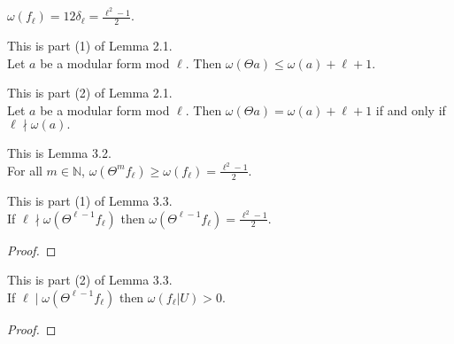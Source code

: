\begin{lemma}
  \label{lem:Filt_fl}
  \leanok
  $ \omega (f_\ell) = 12 \delta_\ell = \frac{\ell^2 - 1}{2}.$
\end{lemma}

\begin{theorem}
  \label{thm:Filt_Theta_bound}
  \leanok
  This is part (1) of Lemma 2.1. \\
  Let $a$ be a modular form mod $\ell$. Then $\omega (\Theta a) \le \omega (a) + \ell + 1$.
\end{theorem}

\begin{theorem}
  \label{thm:Filt_Theta_iff}
  \leanok
  This is part (2) of Lemma 2.1. \\
  Let $a$ be a modular form mod $\ell$. Then $\omega (\Theta a) = \omega (a) + \ell + 1$ 
  if and only if $\ell \nmid \omega (a).$
\end{theorem}

\begin{theorem}
  \label{thm:le_Filt_Theta_fl}
  \leanok
  This is Lemma 3.2. \\
  For all $m \in \mathbb{N}$, $\omega (\Theta^m f_\ell) \ge \omega (f_\ell) = \frac{\ell^2 - 1}{2}.$
\end{theorem} 


\begin{theorem}
  \label{thm:Filt_Theta_pow_l_sub_one} 
  \leanok
  This is part (1) of Lemma 3.3. \\
  If $\ell \nmid \omega (\Theta^{\ell - 1} f_\ell)$ then 
  $\omega (\Theta^{\ell - 1} f_\ell) = \frac{\ell^2 - 1}{2}.$
\end{theorem}
\begin{proof}
  \leanok
\end{proof}


\begin{theorem}
  \label{thm:Filt_U_pos}
  \leanok
  This is part (2) of Lemma 3.3. \\
  If $\ell \mid \omega (\Theta^{\ell - 1} f_\ell)$ then 
  $\omega (f_\ell | U) > 0$.
\end{theorem}
\begin{proof}
  \leanok
\end{proof}


